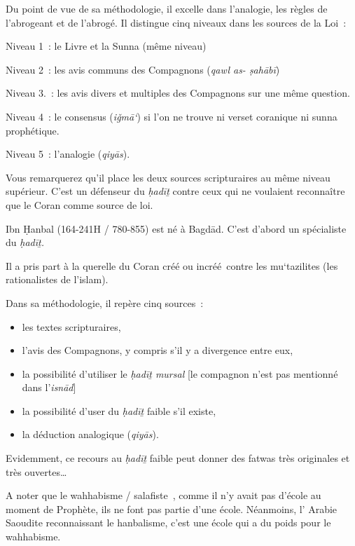 Du point de vue de sa méthodologie, il excelle dans l'analogie, les
règles de l'abrogeant et de l'abrogé. Il distingue cinq niveaux dans les
sources de la Loi~:

Niveau 1~: le Livre et la Sunna (même niveau)

Niveau 2~: les avis communs des Compagnons (\emph{qawl as- ṣahābī})

Niveau 3.~: les avis divers et multiples des Compagnons sur une même
question.

Niveau 4~: le consensus (\emph{iǧmā`}) si l'on ne trouve ni verset
coranique ni sunna prophétique.

Niveau 5~: l'analogie (\emph{qiyās}).

Vous remarquerez qu'il place les deux sources scripturaires au même
niveau supérieur. C'est un défenseur du \emph{ḥadīṯ} contre ceux qui ne
voulaient reconnaître que le Coran comme source de loi.


Ibn Ḥanbal (164-241H / 780-855) est né à Bagdād. C'est d'abord un
spécialiste du \emph{ḥadīṯ.}

Il a pris part à la querelle du Coran créé ou incréé~contre les
mu`tazilites (les rationalistes de l'islam).

Dans sa méthodologie, il repère cinq sources~:

\begin{itemize}
\item
  les textes scripturaires,
\item
  l'avis des Compagnons, y compris s'il y a divergence entre eux,
\item
  la possibilité d'utiliser le \emph{ḥadīṯ mursal} {[}le compagnon n'est
  pas mentionné dans l'\emph{isnād}{]}
\item
  la possibilité d'user du \emph{ḥadīṯ} faible s'il existe,
\item
  la déduction analogique (\emph{qiyās}).
\end{itemize}

Evidemment, ce recours au \emph{ḥadīṯ} faible peut donner des fatwas
très originales et très ouvertes\ldots{}

\begin{Synthesis}
A noter que le wahhabisme / salafiste~, comme il n'y avait pas d'école au moment de
  Prophète, ils ne font pas partie d'une école. Néanmoins, l' Arabie Saoudite reconnaissant le hanbalisme, c'est une école qui a du poids pour le wahhabisme.
\end{Synthesis}

